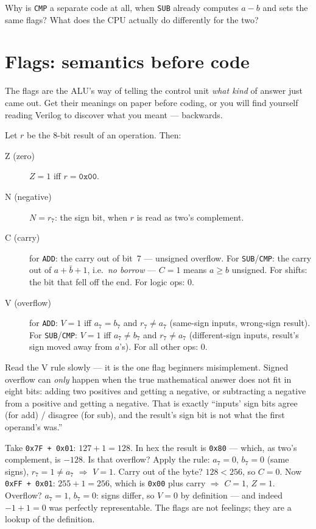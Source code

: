 \begin{exercise}[easy]
Why is \texttt{CMP} a separate code at all, when \texttt{SUB} already
computes $a-b$ and sets the same flags? What does the CPU actually do
differently for the two?
\end{exercise}

\section{Flags: semantics before code}\label{sec:flags14}

The flags are the ALU's way of telling the control unit \emph{what
kind} of answer just came out. Get their meanings on paper before
coding, or you will find yourself reading Verilog to discover what you
meant --- backwards.

\begin{definition}
Let $r$ be the 8-bit result of an operation. Then:
\begin{description}
\item[Z (zero)] $Z=1$ iff $r=\texttt{0x00}$.
\item[N (negative)] $N=r_7$: the sign bit, when $r$ is read as two's
complement.
\item[C (carry)] for \texttt{ADD}: the carry out of bit~7 --- unsigned
overflow. For \texttt{SUB}/\texttt{CMP}: the carry out of
$a+\bar b+1$, i.e.\ \emph{no borrow} --- $C=1$ means $a\geq b$
unsigned. For shifts: the bit that fell off the end. For logic ops: 0.
\item[V (overflow)] for \texttt{ADD}: $V=1$ iff $a_7=b_7$ and
$r_7\neq a_7$ (same-sign inputs, wrong-sign result). For
\texttt{SUB}/\texttt{CMP}: $V=1$ iff $a_7\neq b_7$ and $r_7\neq a_7$
(different-sign inputs, result's sign moved away from $a$'s). For all
other ops: 0.
\end{description}
\end{definition}

Read the V rule slowly --- it is the one flag beginners misimplement.
Signed overflow can \emph{only} happen when the true mathematical
answer does not fit in eight bits: adding two positives and getting a
negative, or subtracting a negative from a positive and getting a
negative. That is exactly ``inputs' sign bits agree (for add) /
disagree (for sub), and the result's sign bit is not what the first
operand's was.''

\begin{example}
Take \texttt{0x7F + 0x01}: $127+1=128$. In hex the result is
\texttt{0x80} --- which, as two's complement, is $-128$. Is that
overflow? Apply the rule: $a_7=0$, $b_7=0$ (same signs), $r_7=1\neq
a_7$ $\Rightarrow$ $V=1$. Carry out of the byte? $128<256$, so $C=0$.
Now \texttt{0xFF + 0x01}: $255+1=256$, which is \texttt{0x00} plus
carry $\Rightarrow$ $C=1$, $Z=1$. Overflow? $a_7=1$, $b_7=0$: signs
differ, so $V=0$ by definition --- and indeed $-1+1=0$ was perfectly
representable. The flags are not feelings; they are a lookup of the
definition.
\end{example}

